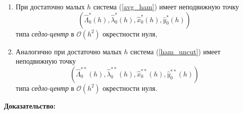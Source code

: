 \begin{utv}
\begin{enumerate}
\item При достаточно малых $h$ система (\ref{avg_ham}) имеет неподвижную точку $$(\hat \Lambda_0^*(h), \hat \lambda_0^*(h), \hat x_0^*(h), \hat y_0^*(h))$$ типа \textit{седло-центр} в $\mathcal{O}(h^2)$ окрестности нуля, 
\item Аналогично при достаточно малых $h$ система (\ref{ham_uncut}) имеет неподвижную точку $$(\hat \Lambda_0^{**}(h),\hat \lambda_0^{**}(h), \hat x_0^{**}(h), \hat y_0^{**}(h))$$ типа \textit{седло-центр} в $\mathcal{O}(h^2)$ окрестности нуля.
\end{enumerate}
\end{utv}
\textbf{Доказательство:}\nopagebreak[4]
